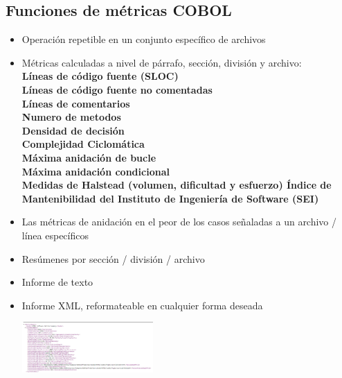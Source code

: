 \documentclass[twoside,twocolumn]{article}
\begin{document}
\subsection{Funciones de métricas COBOL}
\begin{itemize}
\item Operación repetible en un conjunto específico de archivos
\item Métricas calculadas a nivel de párrafo, sección, división y archivo:
\\ \textbf{ Líneas de código fuente (SLOC)}
\\ \textbf{ Líneas de código fuente no comentadas}
\\ \textbf{ Líneas de comentarios}
\\ \textbf{ Numero de metodos}
\\ \textbf{ Densidad de decisión}
\\ \textbf{ Complejidad Ciclomática}
\\ \textbf{ Máxima anidación de bucle}
\\ \textbf{ Máxima anidación condicional}
\\ \textbf{ Medidas de Halstead (volumen, dificultad y esfuerzo)
Índice de Mantenibilidad del Instituto de Ingeniería de Software (SEI)}
\item Las métricas de anidación en el peor de los casos señaladas a un archivo / línea específicos
\item Resúmenes por sección / división / archivo
\item Informe de texto
\item Informe XML, reformateable en cualquier forma deseada
\begin{center}
	\includegraphics[width=5cm]{./Imagenes/cobol} 
	\end{center}

\end{itemize}
\end{document}
